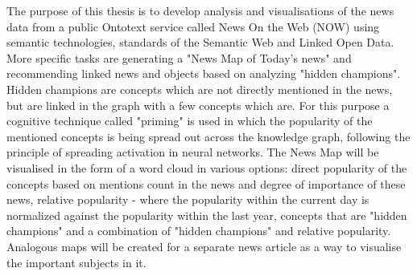 
The purpose of this thesis is to develop analysis and visualisations of the news data from a public Ontotext service called News On the Web (NOW) using semantic technologies, standards of the Semantic Web and Linked Open Data. More specific tasks are generating a "News Map of Today's news" and recommending linked news and objects based on analyzing "hidden champions". Hidden champions are concepts which are not directly mentioned in the news, but are linked in the graph with a few concepts which are. For this purpose a cognitive technique called "priming" is used in which the popularity of the mentioned concepts is being spread out across the knowledge graph, following the principle of spreading activation in neural networks. The News Map will be visualised in the form of a word cloud in various options: direct popularity of the concepts based on mentions count in the news and degree of importance of these news, relative popularity - where the popularity within the current day is normalized against the popularity within the last year, concepts that are "hidden champions" and a combination of "hidden champions" and relative popularity. Analogous maps will be created for a separate news article as a way to visualise the important subjects in it.